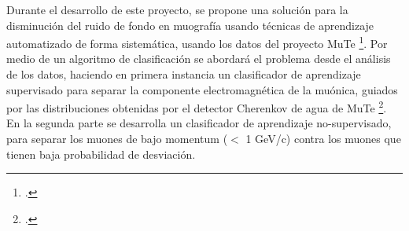 Durante el desarrollo de este proyecto, se propone una solución para la disminución del ruido de fondo en muografía usando técnicas de aprendizaje automatizado de forma sistemática, usando los datos del proyecto MuTe \footcite{pena2019calibration}. Por medio de un algoritmo de clasificación se abordará el problema desde el análisis de los datos, haciendo en primera instancia un clasificador de aprendizaje supervisado para separar la componente electromagnética de la muónica, guiados por las distribuciones obtenidas por el detector Cherenkov de agua de MuTe \footcite{pena2019calibration}. En la segunda parte se  desarrolla un clasificador de aprendizaje no-supervisado, para separar los muones de bajo momentum ($<$ 1 GeV/c) contra los muones que tienen baja probabilidad de desviación.






















